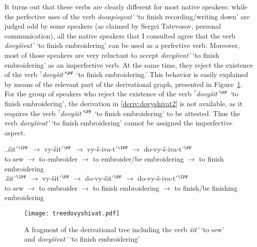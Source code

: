 It turns out that these verbs are clearly different for most native speakers: while the perfective uses of the verb \textit{dozapisyvat'} `to finish recording/writing down' are judged odd by some speakers (as claimed by Sergei Tatevosov, personal communication), all the native speakers that I consulted agree that the verb \textit{dovy\v{s}ivat'} `to finish embroidering' can be used as a perfective verb. Moreover, most of those speakers are very reluctant to accept \textit{dovy\v{s}ivat'} `to finish embroidering' as an imperfective verb. At the same time, they reject the existence of the verb $^?$\textit{dovy\v{s}it'}$^\PF$ `to finish embroidering.' This behavior is easily explained by means of the relevant part of the derivational graph, presented in Figure~\ref{tree:dovyshivat}. For the group of speakers who reject the existence of the verb $^?$\textit{dovy\v{s}it'}$^\PF$ `to finish embroidering', the derivation in \ref{deriv:dovyshivat2} is not available, as it requires the verb $^?$\textit{dovy\v{s}it'}$^\PF$ `to finish embroidering' to be attested. Thus the verb \textit{dovy\v{s}ivat'} `to finish embroidering' cannot be assigned the imperfective aspect.

\ex.\label{deriv:dovyshivat}\ag.\label{deriv:dovyshivat1}\v{s}it'$^\IPF$ $\rightarrow$ vy-\v{s}it'$^\PF$ $\rightarrow$ vy-\v{s}-iva-t'$^\IPF$ $\rightarrow$ do-vy-\v{s}-iva-t'$^\PF$\\
{to sew} $\rightarrow$ {to embroider} $\rightarrow$ {to embroider/be embroidering} $\rightarrow$ {to finish embroidering}\\
\bg.\label{deriv:dovyshivat2}\v{s}it'$^\IPF$ $\rightarrow$ vy-\v{s}it'$^\PF$ $\rightarrow$ do-vy-\v{s}it'$^\PF$ $\rightarrow$ do-vy-\v{s}-iva-t'$^\IPF$\\
{to sew} $\rightarrow$ {to embroider} $\rightarrow$ {to finish embroidering} $\rightarrow$ {to finish/be finishing embroidering}\\

\begin{figure}
\begin{center}
\texttt{[image: treedovyshivat.pdf]}
\caption{A fragment of the derivational tree including the verb \textit{\v{s}it'} `to sew' and \textit{dovy\v{s}ivat'} `to finish embroidering'\label{tree:dovyshivat}}
\end{center}
\end{figure}		

